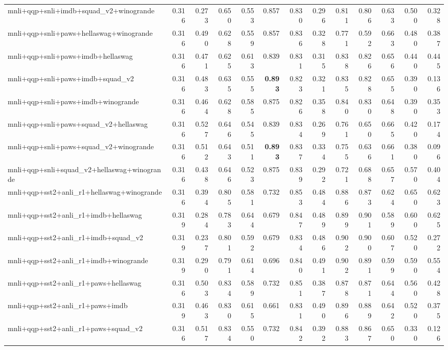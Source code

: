 \begin{table}[t]
\begin{tabular}{lrrrrrrrrrrrr}
    mnli+qqp+snli+imdb+squad\_v2+winogrande & 0.316 & 0.273 & 0.650 & 0.553 & 0.857 & 0.830 & 0.296 & 0.811 & 0.806 & 0.633 & 0.500 & 0.328 \\
    mnli+qqp+snli+paws+hellaswag+winogrande & 0.316 & 0.490 & 0.628 & 0.559 & 0.857 & 0.836 & 0.328 & 0.771 & 0.592 & 0.663 & 0.480 & 0.387 \\
    mnli+qqp+snli+paws+imdb+hellaswag & 0.316 & 0.471 & 0.625 & 0.613 & 0.839 & 0.831 & 0.315 & 0.838 & 0.826 & 0.656 & 0.440 & 0.445 \\
    mnli+qqp+snli+paws+imdb+squad\_v2 & 0.316 & 0.483 & 0.635 & 0.555 & \textbf{0.893} & 0.823 & 0.321 & 0.835 & 0.828 & 0.655 & 0.390 & 0.136 \\
    mnli+qqp+snli+paws+imdb+winogrande & 0.316 & 0.464 & 0.628 & 0.585 & 0.875 & 0.826 & 0.358 & 0.840 & 0.830 & 0.648 & 0.390 & 0.353 \\
    mnli+qqp+snli+paws+squad\_v2+hellaswag & 0.316 & 0.527 & 0.646 & 0.545 & 0.839 & 0.834 & 0.269 & 0.761 & 0.650 & 0.665 & 0.420 & 0.174 \\
    mnli+qqp+snli+paws+squad\_v2+winogrande & 0.316 & 0.512 & 0.643 & 0.511 & \textbf{0.893} & 0.837 & 0.334 & 0.755 & 0.636 & 0.661 & 0.380 & 0.096 \\
    mnli+qqp+snli+squad\_v2+hellaswag+winogrande & 0.316 & 0.438 & 0.646 & 0.523 & 0.875 & 0.839 & 0.292 & 0.721 & 0.688 & 0.657 & 0.570 & 0.404 \\
    mnli+qqp+sst2+anli\_r1+hellaswag+winogrande & 0.316 & 0.394 & 0.805 & 0.581 & 0.732 & 0.853 & 0.484 & 0.886 & 0.873 & 0.624 & 0.650 & 0.623 \\
    mnli+qqp+sst2+anli\_r1+imdb+hellaswag & 0.319 & 0.284 & 0.783 & 0.644 & 0.679 & 0.847 & 0.489 & 0.899 & 0.901 & 0.589 & 0.600 & 0.625 \\
    mnli+qqp+sst2+anli\_r1+imdb+squad\_v2 & 0.319 & 0.237 & 0.801 & 0.592 & 0.679 & 0.834 & 0.486 & 0.902 & 0.900 & 0.607 & 0.520 & 0.272 \\
    mnli+qqp+sst2+anli\_r1+imdb+winogrande & 0.319 & 0.290 & 0.791 & 0.614 & 0.696 & 0.840 & 0.491 & 0.902 & 0.891 & 0.599 & 0.590 & 0.554 \\
    mnli+qqp+sst2+anli\_r1+paws+hellaswag & 0.316 & 0.503 & 0.834 & 0.589 & 0.732 & 0.851 & 0.387 & 0.878 & 0.871 & 0.644 & 0.560 & 0.428 \\
    mnli+qqp+sst2+anli\_r1+paws+imdb & 0.319 & 0.463 & 0.830 & 0.615 & 0.661 & 0.831 & 0.490 & 0.896 & 0.889 & 0.642 & 0.520 & 0.375 \\
    mnli+qqp+sst2+anli\_r1+paws+squad\_v2 & 0.316 & 0.517 & 0.834 & 0.550 & 0.732 & 0.842 & 0.392 & 0.883 & 0.867 & 0.650 & 0.330 & 0.126 \\

\end{tabular}
\end{table}
